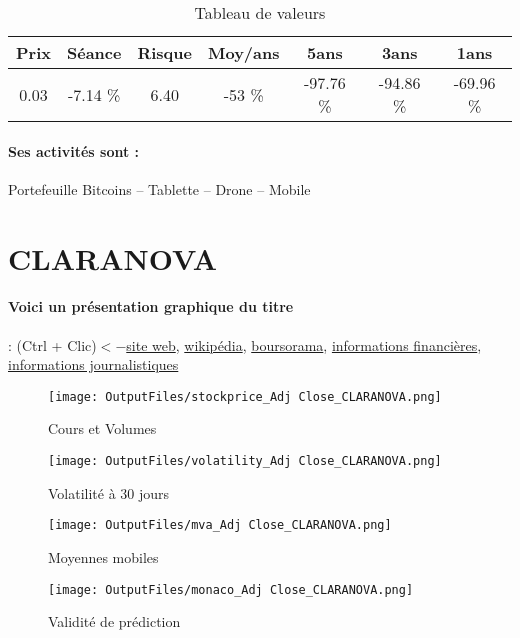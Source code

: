 \documentclass[11pt,a4paper]{report}%
\begin{document}
\begin{table}[H]
  \centering
    \begin{tabular}{|c|c|c|c|c|c|c|}
    \hline
    Prix & Séance & Risque  & Moy/ans & 5ans & 3ans & 1ans \\
    \hline
    0.03 &    -7.14 \%    & 6.40 & -53 \% & -97.76 \% & -94.86 \% & -69.96 \% \\
    \hline
    \end{tabular}%
        \label{tab:table_ARCHOS}%
      \caption{Tableau de valeurs}
\end{table}%

\paragraph{Ses activités sont : } Portefeuille Bitcoins – Tablette – Drone – Mobile 
    
    \newpage

\section{CLARANOVA}

\paragraph{Voici un présentation graphique du titre} : (Ctrl + Clic)$<-$\href{http://www.claranova.com/}{site web}, \href{https://fr.wikipedia.org/wiki/Claranova}{wikipédia}, \href{https://www.boursorama.com/cours/1rPCLA}{boursorama}, \href{https://www.qwant.com/?q=site:https:%2f%2fwww.easybourse.com%2faction-societe%2fCLARANOVA&t=web&client=ext-firefox-hp}{informations financières}, \href{https://bourse.lerevenu.com/cours-de-bourse/fiche-valeur-synthese/CLARANOVA/CLA-FR}{informations journalistiques}
\begin{figure}[!htb]
   \begin{minipage}{0.5\textwidth}
     \centering
     \texttt{[image: OutputFiles/stockprice\_Adj Close\_CLARANOVA.png]}
     \caption{Cours et Volumes}\label{Fig:price_CLARANOVA}
   \end{minipage}\hfill
   \begin{minipage}{0.5\textwidth}
     \centering
     \texttt{[image: OutputFiles/volatility\_Adj Close\_CLARANOVA.png]}
     \caption{Volatilité à 30 jours}\label{Fig:volat_CLARANOVA}
   \end{minipage}
\end{figure}
\begin{figure}[!htb]
   \begin{minipage}{0.5\textwidth}
     \centering
     \texttt{[image: OutputFiles/mva\_Adj Close\_CLARANOVA.png]}
     \caption{Moyennes mobiles}\label{Fig:mva_CLARANOVA}
   \end{minipage}\hfill
   \begin{minipage}{0.5\textwidth}
     \centering
     \texttt{[image: OutputFiles/monaco\_Adj Close\_CLARANOVA.png]}
     \caption{Validité de prédiction}\label{Fig:prediction_CLARANOVA}
   \end{minipage}
\end{figure}
\end{document}
